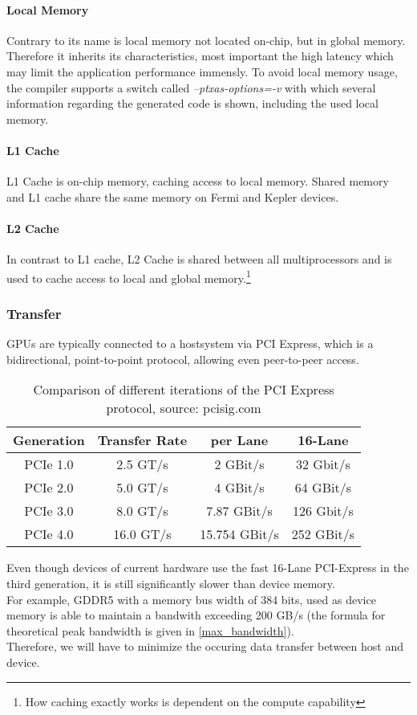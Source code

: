 \paragraph{Local Memory}
Contrary to its name is local memory not located on-chip, but in global memory.
Therefore it inherits its characteristics, most important the high latency which may limit the application performance immensly.
To avoid local memory usage, the compiler supports a switch called \emph{--ptxas-options=-v} with which several information regarding
the generated code is shown, including the used local memory. 
\paragraph{L1 Cache}
L1 Cache is on-chip memory, caching access to local memory. Shared memory and L1 cache share the same memory on Fermi and Kepler devices. \\
\paragraph{L2 Cache}
In contrast to L1 cache, L2 Cache is shared between all multiprocessors and is used to cache access to local and global memory.\footnote{How caching exactly works is dependent on the compute capability}\\
\subsubsection{Transfer}
GPUs are typically connected to a hostsystem via PCI Express, which is a bidirectional, point-to-point protocol, allowing even peer-to-peer access.\\
\begin{table*}
\centering
\begin{tabular}{c|c|c|c}
\textbf{Generation} &   \textbf{Transfer Rate}      & \textbf{per Lane} & \textbf{16-Lane}\\
\hline\hline
PCIe 1.0     &   2.5 GT/s               & 2 GBit/s          & 32 Gbit/s\\
PCIe 2.0     &   5.0 GT/s               & 4 GBit/s          & 64 GBit/s\\
PCIe 3.0     &   8.0 GT/s               & 7.87 GBit/s       & 126 Gbit/s\\
PCIe 4.0     &   16.0 GT/s              & 15.754 GBit/s     & 252 GBit/s\\
\hline
\end{tabular}
\caption{Comparison of different iterations of the PCI Express protocol, source: pcisig.com}
\label{tab:pci_comp}
\end{table*}
Even though devices of current hardware use the fast 16-Lane PCI-Express in the third generation, it is still significantly slower than device memory.\\
For example, GDDR5 with a memory bus width of 384 bits, used as device memory is able to maintain a bandwith exceeding 200 GB/s (the formula for theoretical peak bandwidth is given in \ref{max_bandwidth}).\\
Therefore, we will have to minimize the occuring data transfer between host and device.\\
